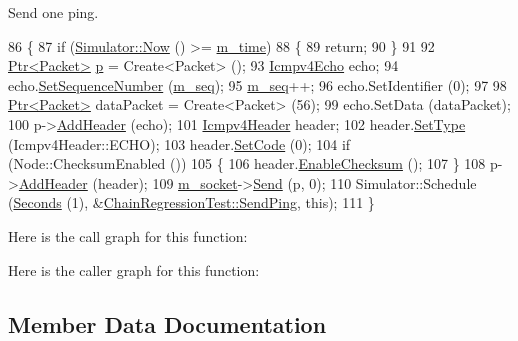 Send one ping. 


\begin{DoxyCode}
86 \{
87   \textcolor{keywordflow}{if} (\hyperlink{group__simulator_gac3635e2e87f7ce316c89290ee1b01d0d}{Simulator::Now} () >= \hyperlink{classChainRegressionTest_aaba809877469a5652b1b62461744e2c7}{m\_time})
88     \{
89       \textcolor{keywordflow}{return};
90     \}
91 
92   \hyperlink{classns3_1_1Ptr}{Ptr<Packet>} \hyperlink{lte__link__budget_8m_ac9de518908a968428863f829398a4e62}{p} = Create<Packet> ();
93   \hyperlink{classns3_1_1Icmpv4Echo}{Icmpv4Echo} echo;
94   echo.\hyperlink{classns3_1_1Icmpv4Echo_acb08fd7a4a626ed59528d0e2a3b50feb}{SetSequenceNumber} (\hyperlink{classChainRegressionTest_a4b038b8f43087a96aaa1b94d6f351733}{m\_seq});
95   \hyperlink{classChainRegressionTest_a4b038b8f43087a96aaa1b94d6f351733}{m\_seq}++;
96   echo.SetIdentifier (0);
97 
98   \hyperlink{classns3_1_1Ptr}{Ptr<Packet>} dataPacket = Create<Packet> (56);
99   echo.SetData (dataPacket);
100   p->\hyperlink{classns3_1_1Packet_a465108c595a0bc592095cbcab1832ed8}{AddHeader} (echo);
101   \hyperlink{classns3_1_1Icmpv4Header}{Icmpv4Header} header;
102   header.\hyperlink{classns3_1_1Icmpv4Header_a48c46557787fac004f0de959294ad959}{SetType} (Icmpv4Header::ECHO);
103   header.\hyperlink{classns3_1_1Icmpv4Header_a283ff70177edcb108317263ba2924a5b}{SetCode} (0);
104   \textcolor{keywordflow}{if} (Node::ChecksumEnabled ())
105     \{
106       header.\hyperlink{classns3_1_1Icmpv4Header_ac4b154ae9b6e2a151a2d0f42a491d3b9}{EnableChecksum} ();
107     \}
108   p->\hyperlink{classns3_1_1Packet_a465108c595a0bc592095cbcab1832ed8}{AddHeader} (header);
109   \hyperlink{classChainRegressionTest_ad5f524009bcd54ac069a4a6b9d58bcd0}{m\_socket}->\hyperlink{classns3_1_1Socket_a036901c8f485fe5b6eab93b7f2ec289d}{Send} (p, 0);
110   Simulator::Schedule (\hyperlink{group__timecivil_ga33c34b816f8ff6628e33d5c8e9713b9e}{Seconds} (1), &\hyperlink{classChainRegressionTest_a7282b25c193b2b0f237263616b10f251}{ChainRegressionTest::SendPing}, \textcolor{keyword}{
      this});
111 \}
\end{DoxyCode}


Here is the call graph for this function\+:




Here is the caller graph for this function\+:




\subsection{Member Data Documentation}
